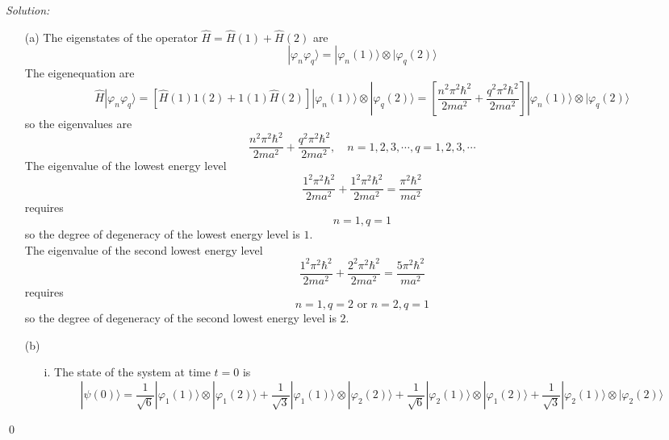 \documentclass[12pt,a4paper]{article}
\newenvironment{sol}
    {\emph{Solution:}
    }
    {
    \qed
    }
\begin{document}
\begin{sol}
\begin{itemize}
\item[(a)] The eigenstates of the operator $\hat{H}=\hat{H}(1)+\hat{H}(2)$ are
\begin{equation}
|\varphi_n\varphi_q\rangle=|\varphi_n(1)\rangle\otimes|\varphi_q(2)\rangle
\end{equation}
The eigenequation are
\begin{equation}
\hat{H}|\varphi_n\varphi_q\rangle=[\hat{H}(1)1(2)+1(1)\hat{H}(2)]|\varphi_n(1)\rangle\otimes|\varphi_q(2)\rangle=\left[\frac{n^2\pi^2\hbar^2}{2ma^2}+\frac{q^2\pi^2\hbar^2}{2ma^2}\right]|\varphi_n(1)\rangle\otimes|\varphi_q(2)\rangle
\end{equation}
so the eigenvalues are
\begin{equation}
\frac{n^2\pi^2\hbar^2}{2ma^2}+\frac{q^2\pi^2\hbar^2}{2ma^2},\quad n=1,2,3,\cdots,q=1,2,3,\cdots
\end{equation}
The eigenvalue of the lowest energy level
\begin{equation}
\frac{1^2\pi^2\hbar^2}{2ma^2}+\frac{1^2\pi^2\hbar^2}{2ma^2}=\frac{\pi^2\hbar^2}{ma^2}
\end{equation}
requires
\begin{equation}
n=1,q=1
\end{equation}
so the degree of degeneracy of the lowest energy level is $1$.\\
The eigenvalue of the second lowest energy level
\begin{equation}
\frac{1^2\pi^2\hbar^2}{2ma^2}+\frac{2^2\pi^2\hbar^2}{2ma^2}=\frac{5\pi^2\hbar^2}{ma^2}
\end{equation}
requires
\begin{equation}
n=1,q=2\text{ or }n=2,q=1
\end{equation}
so the degree of degeneracy of the second lowest energy level is $2$.\\
\item[(b)]
\begin{itemize}
\item[i.] The state of the system at time $t=0$ is
\small\begin{equation}
|\psi(0)\rangle=\frac{1}{\sqrt{6}}|\varphi_1(1)\rangle\otimes|\varphi_1(2)\rangle+\frac{1}{\sqrt{3}}|\varphi_1(1)\rangle\otimes|\varphi_2(2)\rangle+\frac{1}{\sqrt{6}}|\varphi_2(1)\rangle\otimes|\varphi_1(2)\rangle+\frac{1}{\sqrt{3}}|\varphi_2(1)\rangle\otimes|\varphi_2(2)\rangle
\end{equation}\normalsize

\end{itemize}
\end{itemize}
\end{sol}
\end{document}
